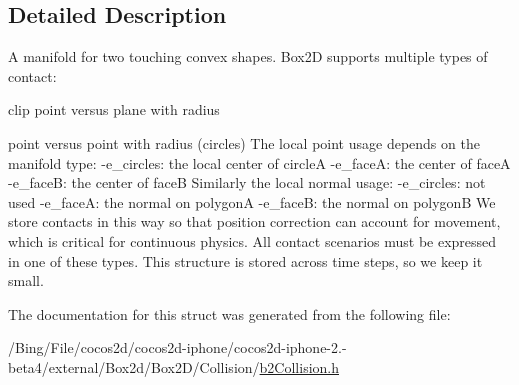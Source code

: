 \subsection{Detailed Description}
A manifold for two touching convex shapes. Box2\-D supports multiple types of contact\-:
\begin{DoxyItemize}
\item clip point versus plane with radius
\item point versus point with radius (circles) The local point usage depends on the manifold type\-: -\/e\-\_\-circles\-: the local center of circle\-A -\/e\-\_\-face\-A\-: the center of face\-A -\/e\-\_\-face\-B\-: the center of face\-B Similarly the local normal usage\-: -\/e\-\_\-circles\-: not used -\/e\-\_\-face\-A\-: the normal on polygon\-A -\/e\-\_\-face\-B\-: the normal on polygon\-B We store contacts in this way so that position correction can account for movement, which is critical for continuous physics. All contact scenarios must be expressed in one of these types. This structure is stored across time steps, so we keep it small. 
\end{DoxyItemize}

The documentation for this struct was generated from the following file\-:\begin{DoxyCompactItemize}
\item 
/\-Bing/\-File/cocos2d/cocos2d-\/iphone/cocos2d-\/iphone-\/2.-\/beta4/external/\-Box2d/\-Box2\-D/\-Collision/\hyperlink{b2_collision_8h}{b2\-Collision.\-h}\end{DoxyCompactItemize}
